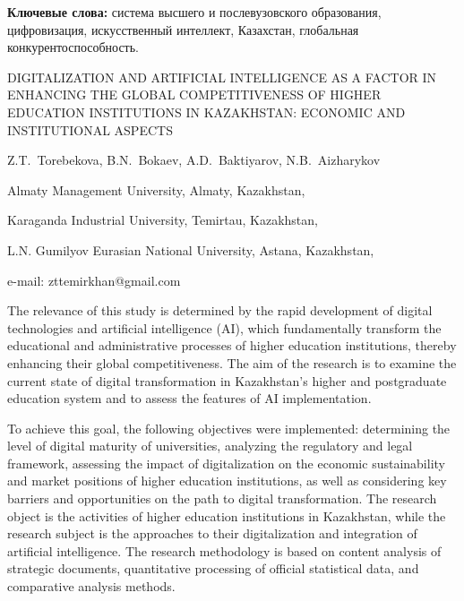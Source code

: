 {\bfseries Ключевые слова:} система высшего и послевузовского образования,
цифровизация, искусственный интеллект, Казахстан, глобальная
конкурентоспособность.

\begin{header}
DIGITALIZATION AND ARTIFICIAL INTELLIGENCE AS A FACTOR IN ENHANCING THE GLOBAL COMPETITIVENESS OF HIGHER EDUCATION INSTITUTIONS IN KAZAKHSTAN: ECONOMIC AND INSTITUTIONAL ASPECTS

Z.T.~Torebekova\envelope,
B.N.~Bokaev,
A.D.~Baktiyarov,
N.B.~Aizharykov
\end{header}

\begin{affil}
Almaty Management University, Almaty, Kazakhstan,

Karaganda Industrial University, Temirtau, Kazakhstan,

L.N. Gumilyov Eurasian National University, Astana, Kazakhstan,

e-mail: zttemirkhan@gmail.com
\end{affil}

The relevance of this study is determined by the rapid development of
digital technologies and artificial intelligence (AI), which
fundamentally transform the educational and administrative processes of
higher education institutions, thereby enhancing their global
competitiveness. The aim of the research is to examine the current state
of digital transformation in Kazakhstan's higher and postgraduate
education system and to assess the features of AI implementation.

To achieve this goal, the following objectives were implemented:
determining the level of digital maturity of universities, analyzing the
regulatory and legal framework, assessing the impact of digitaliza\-tion
on the economic sustainability and market positions of higher education
institutions, as well as considering key barriers and opportunities on
the path to digital transformation. The research object is the
activities of higher education institutions in Kazakhstan, while the
research subject is the approaches to their digitalization and
integration of artificial intelligence. The research methodology is
based on content analysis of strategic documents, quantitative
processing of official statistical data, and comparative analy\-sis
methods.

